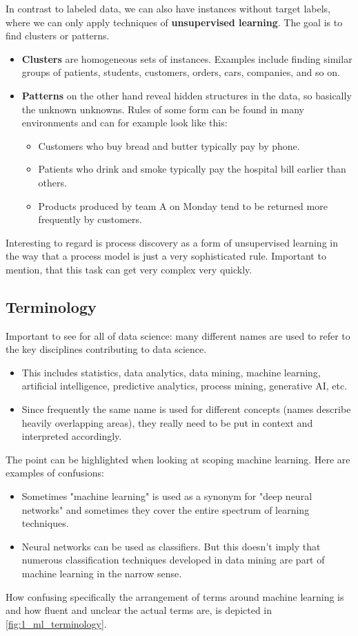 In contrast to labeled data, we can also have instances without target labels, where we can only apply techniques of \textbf{unsupervised learning}. The goal is to find clusters or patterns.
\begin{itemize}
  \item \textbf{Clusters} are homogeneous sets of instances. Examples include finding similar groups of patients, students, customers, orders, cars, companies, and so on.
  \item \textbf{Patterns} on the other hand reveal hidden structures in the data, so basically the unknown unknowns. Rules of some form can be found in many environments and can for example look like this:
  \begin{itemize}
    \item Customers who buy bread and butter typically pay by phone.
    \item Patients who drink and smoke typically pay the hospital bill earlier than others.
    \item Products produced by team A on Monday tend to be returned more frequently by customers.
  \end{itemize} 
\end{itemize}

Interesting to regard is process discovery as a form of unsupervised learning in the way that a process model is just a very sophisticated rule. Important to mention, that this task can get very complex very quickly.


\subsection*{Terminology}
Important to see for all of data science: many different names are used to refer to the key disciplines contributing to data science.
\begin{itemize}
  \item This includes statistics, data analytics, data mining, machine learning, artificial intelligence, predictive analytics, process mining, generative AI, etc.
  \item Since frequently the same name is used for different concepts (names describe heavily overlapping areas), they really need to be put in context and interpreted accordingly.
\end{itemize}

The point can be highlighted when looking at scoping machine learning. Here are examples of confusions:
\begin{itemize}
  \item Sometimes "machine learning" is used as a synonym for "deep neural networks" and sometimes they cover the entire spectrum of learning techniques.
  \item Neural networks can be used as classifiers. But this doesn't imply that numerous classification techniques developed in data mining are part of machine learning in the narrow sense.
\end{itemize}
How confusing specifically the arrangement of terms around machine learning is and how fluent and unclear the actual terms are, is depicted in \ref{fig:1_ml_terminology}.

